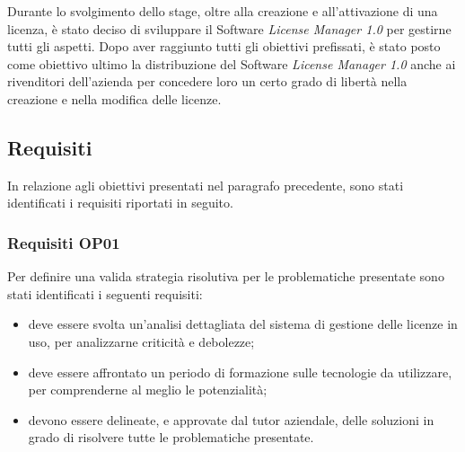 Durante lo svolgimento dello stage, oltre alla creazione e all'attivazione di una licenza, è stato deciso di sviluppare il Software \textit{License Manager 1.0} per gestirne tutti gli aspetti. Dopo aver raggiunto tutti gli obiettivi prefissati, è stato posto come obiettivo ultimo la distribuzione del Software \textit{License Manager 1.0} anche ai rivenditori dell'azienda per concedere loro un certo grado di libertà nella creazione e nella modifica delle licenze. 

\subsection{Requisiti}

In relazione agli obiettivi presentati nel paragrafo precedente, sono stati identificati i requisiti riportati in seguito.

\subsubsection{Requisiti OP01}
Per definire una valida strategia risolutiva per le problematiche presentate sono stati identificati i seguenti requisiti:

\begin{itemize}
\item deve essere svolta un'analisi dettagliata del sistema di gestione delle licenze in uso, per analizzarne criticità e debolezze;
\item deve essere affrontato un periodo di formazione sulle tecnologie da utilizzare, per comprenderne al meglio le potenzialità;
\item devono essere delineate, e approvate dal tutor aziendale, delle soluzioni in grado di risolvere tutte le problematiche presentate.

\end{itemize}

